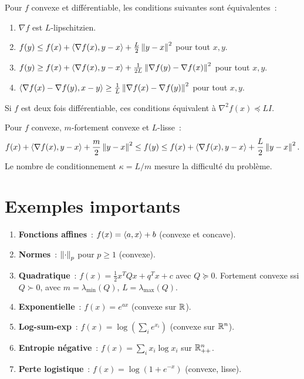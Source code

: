 \begin{theoreme}
\label{thm:lissage}
Pour $f$ convexe et diff\'erentiable, les conditions suivantes sont \'equivalentes~:
\begin{enumerate}
    \item $\nabla f$ est $L$-lipschitzien.
    \item $f(y) \leq f(x) + \langle \nabla f(x), y-x \rangle + \frac{L}{2}\left\| y-x \right\|^2$ pour tout $x, y$.
    \item $f(y) \geq f(x) + \langle \nabla f(x), y-x \rangle + \frac{1}{2L}\left\| \nabla f(y) - \nabla f(x) \right\|^2$ pour tout $x, y$.
    \item $\langle \nabla f(x) - \nabla f(y), x - y \rangle \geq \frac{1}{L}\left\| \nabla f(x) - \nabla f(y) \right\|^2$ pour tout $x, y$.
\end{enumerate}
Si $f$ est deux fois diff\'erentiable, ces conditions \'equivalent \`a $\nabla^2 f(x) \preceq LI$.
\end{theoreme}

\begin{formules}[title=\textbf{Encadrement fondamental}]
Pour $f$ convexe, $m$-fortement convexe et $L$-lisse~:
\[
    f(x) + \langle \nabla f(x), y-x \rangle + \frac{m}{2}\left\| y-x \right\|^2
    \leq f(y) \leq
    f(x) + \langle \nabla f(x), y-x \rangle + \frac{L}{2}\left\| y-x \right\|^2.
\]
Le nombre de conditionnement $\kappa = L/m$ mesure la difficult\'e du probl\`eme.
\end{formules}

\section{Exemples importants}

\begin{exemple}
\begin{enumerate}
    \item \textbf{Fonctions affines}~: $f(x) = \langle a, x \rangle + b$ (convexe et concave).
    \item \textbf{Normes}~: $\left\| \cdot \right\|_p$ pour $p \geq 1$ (convexe).
    \item \textbf{Quadratique}~: $f(x) = \frac{1}{2}x^TQx + q^Tx + c$ avec $Q \succeq 0$.
          Fortement convexe ssi $Q \succ 0$, avec $m = \lambda_{\min}(Q)$, $L = \lambda_{\max}(Q)$.
    \item \textbf{Exponentielle}~: $f(x) = e^{ax}$ (convexe sur $\mathbb{R}$).
    \item \textbf{Log-sum-exp}~: $f(x) = \log(\sum_i e^{x_i})$ (convexe sur $\mathbb{R}^n$).
    \item \textbf{Entropie n\'egative}~: $f(x) = \sum_i x_i \log x_i$ sur $\mathbb{R}^n_{++}$.
    \item \textbf{Perte logistique}~: $f(x) = \log(1 + e^{-x})$ (convexe, lisse).
\end{enumerate}
\end{exemple}

